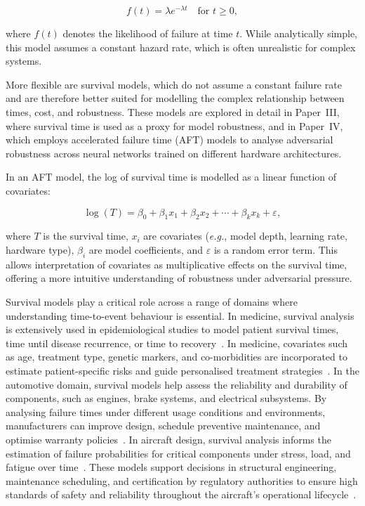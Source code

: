 \begin{equation*} f(t) = \lambda e^{-\lambda t} \quad \text{for } t \geq 0, \end{equation*}

where $f(t)$ denotes the likelihood of failure at time $t$. 
While analytically simple, this model assumes a constant hazard rate, which is often unrealistic for complex systems.

More flexible are survival models, which do not assume a constant failure rate and are therefore better suited for modelling the complex relationship between times, cost, and robustness.
These models are explored in detail in Paper~III, where survival time is used as a proxy for model robustness, and in Paper~IV, which employs accelerated failure time (AFT) models to analyse adversarial robustness across neural networks trained on different hardware architectures.

In an AFT model, the log of survival time is modelled as a linear function of covariates:

\begin{equation*} 
\log(T) = \beta_0 + \beta_1 x_1 + \beta_2 x_2 + \cdots + \beta_k x_k + \varepsilon, \end{equation*}

where $T$ is the survival time, $x_i$ are covariates (\textit{e.g.}, model depth, learning rate, hardware type), $\beta_i$ are model coefficients, and $\varepsilon$ is a random error term. This allows interpretation of covariates as multiplicative effects on the survival time, offering a more intuitive understanding of robustness under adversarial pressure.

Survival models play a critical role across a range of domains where understanding time-to-event behaviour is essential. 
In medicine, survival analysis is extensively used in epidemiological studies to model patient survival times, time until disease recurrence, or time to recovery~\cite{aft_models}. 
In medicine, covariates such as age, treatment type, genetic markers, and co-morbidities are incorporated to estimate patient-specific risks and guide personalised treatment strategies~\cite{aft_models}. 
In the automotive domain, survival models help assess the reliability and durability of components, such as engines, brake systems, and electrical subsystems. 
By analysing failure times under different usage conditions and environments, manufacturers can improve design, schedule preventive maintenance, and optimise warranty policies~\cite{automotive_survival}. 
In aircraft design, survival analysis informs the estimation of failure probabilities for critical components under stress, load, and fatigue over time~\cite{aircraft_survival}. 
These models support decisions in structural engineering, maintenance scheduling, and certification by regulatory authorities to ensure high standards of safety and reliability throughout the aircraft’s operational lifecycle~\cite{aircraft_survival}.


